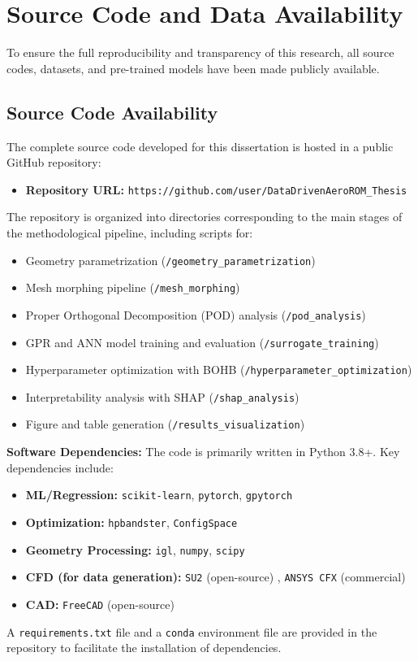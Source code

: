 \documentclass[dscexam, EN]{ufabcFHZh}
\begin{document}
\chapter{Source Code and Data Availability}
\label{app:code_data}

To ensure the full reproducibility and transparency of this research, all source codes, datasets, and pre-trained models have been made publicly available.

\section{Source Code Availability}
\label{sec:code_availability}

The complete source code developed for this dissertation is hosted in a public GitHub repository:
\begin{itemize}
    \item \textbf{Repository URL:} \texttt{https://github.com/user/DataDrivenAeroROM\_Thesis}
\end{itemize}
The repository is organized into directories corresponding to the main stages of the methodological pipeline, including scripts for:
\begin{itemize}
    \item Geometry parametrization (\texttt{/geometry\_parametrization})
    \item Mesh morphing pipeline (\texttt{/mesh\_morphing}) \cite{[1]}
    \item Proper Orthogonal Decomposition (POD) analysis (\texttt{/pod\_analysis}) \cite{[1, 1]}
    \item GPR and ANN model training and evaluation (\texttt{/surrogate\_training}) \cite{[1, 1]}
    \item Hyperparameter optimization with BOHB (\texttt{/hyperparameter\_optimization}) \cite{[1]}
    \item Interpretability analysis with SHAP (\texttt{/shap\_analysis}) \cite{[1]}
    \item Figure and table generation (\texttt{/results\_visualization})
\end{itemize}

\noindent\textbf{Software Dependencies:}
The code is primarily written in Python 3.8+. Key dependencies include:
\begin{itemize}
    \item \textbf{ML/Regression:} \texttt{scikit-learn}, \texttt{pytorch}, \texttt{gpytorch}
    \item \textbf{Optimization:} \texttt{hpbandster}, \texttt{ConfigSpace}
    \item \textbf{Geometry Processing:} \texttt{igl}, \texttt{numpy}, \texttt{scipy}
    \item \textbf{CFD (for data generation):} \texttt{SU2} (open-source) \cite{[1]}, \texttt{ANSYS CFX} (commercial) \cite{[1]}
    \item \textbf{CAD:} \texttt{FreeCAD} (open-source) \cite{[1]}
\end{itemize}
A \texttt{requirements.txt} file and a \texttt{conda} environment file are provided in the repository to facilitate the installation of dependencies.
\end{document}
